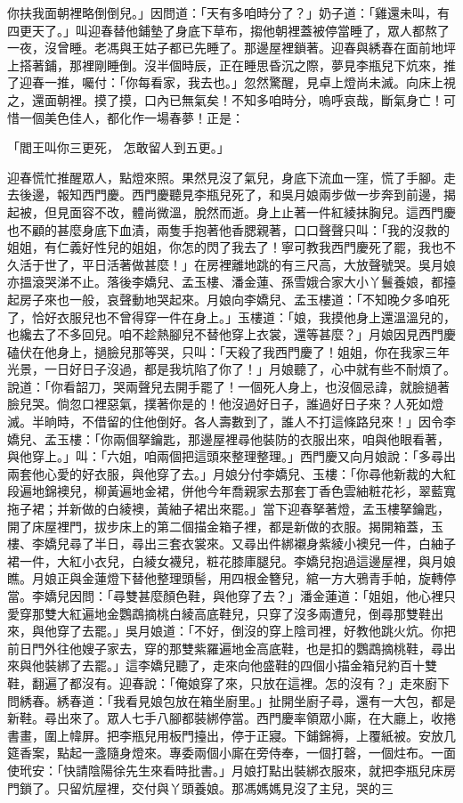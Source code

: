 \begin{showcontents}{}
你扶我面朝裡略倒倒兒。」因問道：「天有多咱時分了？」奶子道：「雞還未叫，有四更天了。」叫迎春替他鋪墊了身底下草布，搊他朝裡蓋被停當睡了，眾人都熬了一夜，沒曾睡。老馮與王姑子都已先睡了。那邊屋裡鎖著。迎春與綉春在面前地坪上搭著鋪，那裡剛睡倒。沒半個時辰，正在睡思昏沉之際，夢見李瓶兒下炕來，推了迎春一推，囑付：「你每看家，我去也。」忽然驚醒，見卓上燈尚未滅。向床上視之，還面朝裡。摸了摸，口內已無氣矣！不知多咱時分，嗚呼哀哉，斷氣身亡！可惜一個美色佳人，都化作一場春夢！正是：

「閻王叫你三更死，  怎敢留人到五更。」

迎春慌忙推醒眾人，點燈來照。果然見沒了氣兒，身底下流血一窪，慌了手腳。走去後邊，報知西門慶。西門慶聽見李瓶兒死了，和吳月娘兩步做一步奔到前邊，揭起被，但見面容不改，體尚微溫，脫然而逝。身上止著一件紅綾抹胸兒。這西門慶也不顧的甚麼身底下血漬，兩隻手抱著他香腮親著，口口聲聲只叫：「我的沒救的姐姐，有仁義好性兒的姐姐，你怎的閃了我去了！寧可教我西門慶死了罷，我也不久活于世了，平日活著做甚麼！」在房裡離地跳的有三尺高，大放聲號哭。吳月娘亦搵滾哭涕不止。落後李嬌兒、孟玉樓、潘金蓮、孫雪娥合家大小丫鬟養娘，都擡起房子來也一般，哀聲動地哭起來。月娘向李嬌兒、孟玉樓道：「不知晚夕多咱死了，恰好衣服兒也不曾得穿一件在身上。」玉樓道：「娘，我摸他身上還溫溫兒的，也纔去了不多回兒。咱不趁熱腳兒不替他穿上衣裳，還等甚麼？」月娘因見西門慶磕伏在他身上，撾臉兒那等哭，只叫：「天殺了我西門慶了！姐姐，你在我家三年光景，一日好日子沒過，都是我坑陷了你了！」月娘聽了，心中就有些不耐煩了。說道：「你看韶刀，哭兩聲兒去開手罷了！一個死人身上，也沒個忌諱，就臉撾著臉兒哭。倘忽口裡惡氣，撲著你是的！他沒過好日子，誰過好日子來？人死如燈滅。半晌時，不借留的住他倒好。各人壽數到了，誰人不打這條路兒來！」因令李嬌兒、孟玉樓：「你兩個拏鑰匙，那邊屋裡尋他裝防的衣服出來，咱與他眼看著，與他穿上。」叫：「六姐，咱兩個把這頭來整理整理。」西門慶又向月娘說：「多尋出兩套他心愛的好衣服，與他穿了去。」月娘分付李嬌兒、玉樓：「你尋他新裁的大紅段遍地錦襖兒，柳黃遍地金裙，併他今年喬親家去那套丁香色雲紬粧花衫，翠藍寬拖子裙；并新做的白綾襖，黃紬子裙出來罷。」當下迎春拏著燈，孟玉樓拏鑰匙，開了床屋裡門，拔步床上的第二個描金箱子裡，都是新做的衣服。揭開箱蓋，玉樓、李嬌兒尋了半日，尋出三套衣裳來。又尋出件綁襯身紫綾小襖兒一件，白紬子裙一件，大紅小衣兒，白綾女襪兒，粧花膝庫腿兒。李嬌兒抱過這邊屋裡，與月娘瞧。月娘正與金蓮燈下替他整理頭髻，用四根金簪兒，綰一方大鴉青手帕，旋轉停當。李嬌兒因問：「尋雙甚麼顏色鞋，與他穿了去？」潘金蓮道：「姐姐，他心裡只愛穿那雙大紅遍地金鸚鵡摘桃白綾高底鞋兒，只穿了沒多兩遭兒，倒尋那雙鞋出來，與他穿了去罷。」吳月娘道：「不好，倒沒的穿上陰司裡，好教他跳火炕。你把前日門外往他嫂子家去，穿的那雙紫羅遍地金高底鞋，也是扣的鸚鵡摘桃鞋，尋出來與他裝綁了去罷。」這李嬌兒聽了，走來向他盛鞋的四個小描金箱兒約百十雙鞋，翻遍了都沒有。迎春說：「俺娘穿了來，只放在這裡。怎的沒有？」走來廚下問綉春。綉春道：「我看見娘包放在箱坐廚里。」扯開坐廚子尋，還有一大包，都是新鞋。尋出來了。眾人七手八腳都裝綁停當。西門慶率領眾小廝，在大廳上，收捲書畫，圍上幃屏。把李瓶兒用板門擡出，停于正寢。下鋪錦褥，上覆紙被。安放几筵香案，點起一盞隨身燈來。專委兩個小廝在旁侍奉，一個打磬，一個炷布。一面使玳安：「快請陰陽徐先生來看時批書。」月娘打點出裝綁衣服來，就把李瓶兒床房門鎖了。只留炕屋裡，交付與丫頭養娘。那馮媽媽見沒了主兒，哭的三
\end{showcontents}
